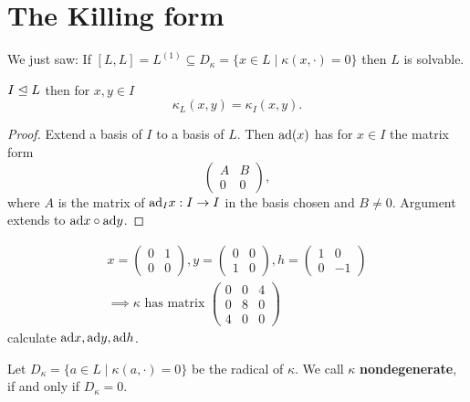 \section{The Killing form}
We just saw: If $[L,L]=L^{(1)} \subseteq D_\kappa=\{x \in L \mid \kappa(x, \cdot)=0\}$
then $L$ is solvable.

\begin{lemma}
    $I \trianglelefteq L$ then for $x,y \in I$
    $$ \kappa_L(x,y) = \kappa_I(x,y).$$
\end{lemma}
\begin{proof}
    Extend a basis of $I$ to a basis of $L$. Then $\text{ad} (x)$ has for $x \in I$ the matrix form
    $$ \begin{pmatrix}
        A & B\\
        0 & 0
    \end{pmatrix},$$
    where $A$ is the matrix of $\text{ad}_I x: I \to I$ in the basis chosen and $B \neq 0$.
    Argument extends to $\text{ad} x \circ \text{ad} y$.
\end{proof}

\begin{example}
    \begin{align*}
        x = \begin{pmatrix}
            0 & 1\\
            0 & 0
        \end{pmatrix},
        y = \begin{pmatrix}
            0 & 0\\
            1 & 0
        \end{pmatrix},
        h = \begin{pmatrix}
            1 & 0\\
            0 & -1
        \end{pmatrix}\\
        \implies \kappa \text{ has matrix } \begin{pmatrix}
            0 & 0 & 4\\
            0 & 8 & 0\\
            4 & 0 & 0
        \end{pmatrix}
    \end{align*}
    calculate $\text{ad} x, \text{ad} y, \text{ad} h$.
\end{example}

\begin{definition}
    Let $D_\kappa = \{a \in L \mid \kappa(a, \cdot) = 0\}$ be the radical of $\kappa$. We call
    $\kappa$ \textbf{nondegenerate}, if and only if $ D_\kappa=0$.    
\end{definition}

